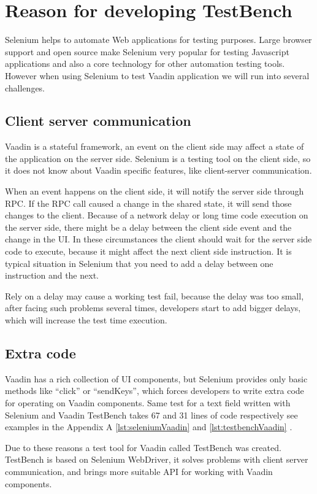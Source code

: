 \chapter{Reason for developing TestBench}
\label{ch:reasontestbenchdevelopment}
Selenium helps to automate Web applications for testing purposes. Large browser
support and open source make Selenium very popular for testing Javascript applications
and also a core technology for other automation testing tools. However when
using Selenium to test Vaadin application we will run into several challenges.

\section{Client server communication}
Vaadin is a stateful framework, an event on the client side may affect a state
of the application on the server side. Selenium is a testing tool on the client side, 
so it does not know about Vaadin specific features, like client-server communication. 

When an event happens on the client side, it will notify the server side through RPC.
If the RPC call caused a change in the shared state, it will send those changes to the client.
Because of a network delay or long time code execution on the server side, 
there might be a delay between the client side event and the change in the UI.
In these circumstances the client should wait for the server side code to execute,
because it might affect the next client side instruction.  
It is typical situation in Selenium that you need to add a delay between one instruction and the next.

Rely on a delay may cause a working test fail, because the delay was too small,
after facing such problems several times, developers start to add bigger delays,
which will increase the test time execution. 

\section{Extra code}
 Vaadin has a rich collection of UI components, but Selenium provides only
 basic methods like ``click'' or ``sendKeys'', which forces developers to write
 extra code for operating on Vaadin components. Same test for a text field
 written with Selenium  and Vaadin TestBench takes 67 and 31 lines of code
 respectively see examples in the Appendix A \ref{lst:seleniumVaadin} and
 \ref{lst:testbenchVaadin} .
   
 Due to these reasons a test tool for Vaadin called TestBench was created.
 TestBench is based on Selenium WebDriver, it solves  problems with client server communication,
 and brings more suitable API for working with Vaadin components.
